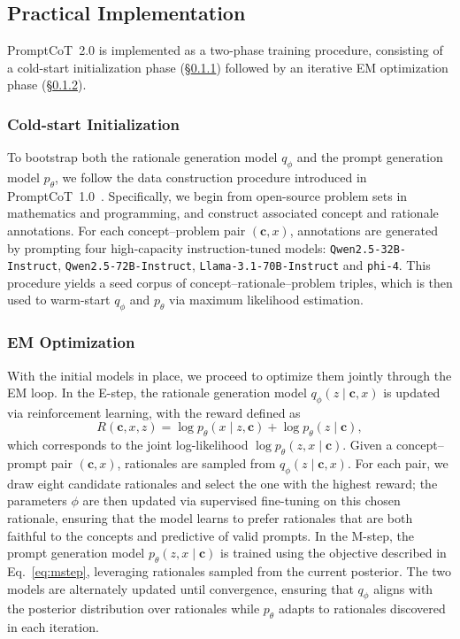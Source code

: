 \subsection{Practical Implementation}
\label{sec:implementation}
PromptCoT~2.0 is implemented as a two-phase training procedure, consisting of a cold-start initialization phase (\S\ref{sec:cold-start}) followed by an iterative EM optimization phase (\S\ref{sec:em}).



\subsubsection{Cold-start Initialization}
\label{sec:cold-start}

To bootstrap both the rationale generation model $q_\phi$ and the prompt generation model $p_\theta$, we follow the data construction procedure introduced in PromptCoT~1.0~\citep{zhao2025promptcot}. Specifically, we begin from open-source problem sets in mathematics and programming, and construct associated concept and rationale annotations. For each concept–problem pair $(\mathbf{c}, x)$, annotations are generated by prompting four high-capacity instruction-tuned models: \texttt{Qwen2.5-32B-Instruct}, \texttt{Qwen2.5-72B-Instruct}, \texttt{Llama-3.1-70B-Instruct} and \texttt{phi-4}. This procedure yields a seed corpus of concept–rationale–problem triples, which is then used to warm-start $q_\phi$ and $p_\theta$ via maximum likelihood estimation.



\subsubsection{EM Optimization}
\label{sec:em}

With the initial models in place, we proceed to optimize them jointly through the EM loop. In the E-step, the rationale generation model $q_\phi(z \mid \mathbf{c}, x)$ is updated via reinforcement learning, with the reward defined as
\begin{equation}
\label{eq:reward}
R(\mathbf{c}, x, z) = \log p_\theta(x \mid z, \mathbf{c}) + \log p_\theta(z \mid \mathbf{c}),
\end{equation}
which corresponds to the joint log-likelihood $\log p_\theta(z, x \mid \mathbf{c})$. 
Given a concept–prompt pair $(\mathbf{c}, x)$, rationales are sampled from $q_\phi(z \mid \mathbf{c}, x)$.  
For each pair, we draw eight candidate rationales and select the one with the highest reward; the parameters $\phi$ are then updated via supervised fine-tuning on this chosen rationale, ensuring that the model learns to prefer rationales that are both faithful to the concepts and predictive of valid prompts. 
In the M-step, the prompt generation model $p_\theta(z, x \mid \mathbf{c})$ is trained using the objective described in Eq.~\ref{eq:mstep}, leveraging rationales sampled from the current posterior. The two models are alternately updated until convergence, ensuring that $q_\phi$ aligns with the posterior distribution over rationales while $p_\theta$ adapts to rationales discovered in each iteration.





